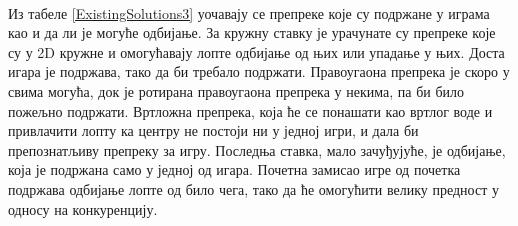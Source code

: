 \\ \indent
Из табеле \ref{ExistingSolutions3} уочавају се препреке које су подржане у играма као и да ли је могуће одбијање. За кружну ставку је урачунате су препреке које су у 2D кружне и омогућавају лопте одбијање од њих или упадање у њих. Доста игара је подржава, тако да би требало подржати. Правоугаона препрека је скоро у свима могућа, док је ротирана правоугаона препрека у некима, па би било пожељно подржати. Вртложна препрека, која ће се понашати као вртлог воде и привлачити лопту ка центру не постоји ни у једној игри, и дала би препознатљиву препреку за игру. Последња ставка, мало зачуђујуће, је одбијање, која је подржана само у једној од игара. Почетна замисао игре од почетка подржава одбијање лопте од било чега, тако да ће омогућити велику предност у односу на конкуренцију.
